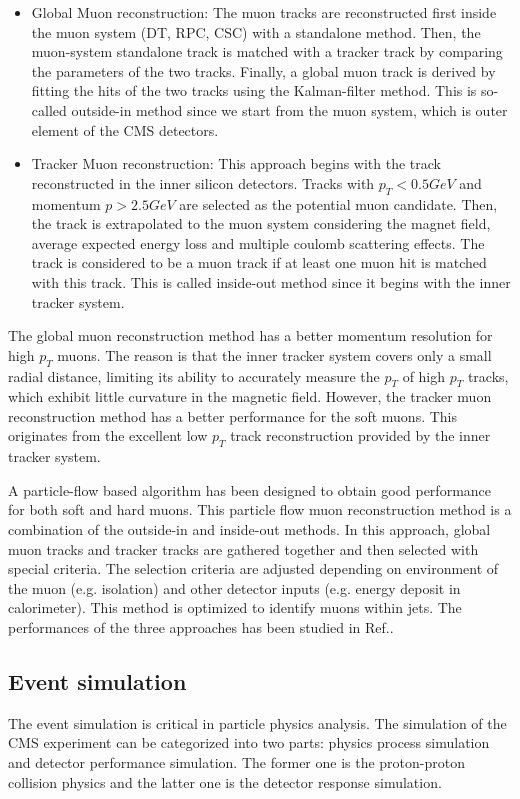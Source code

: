\begin{itemize}
	\item Global Muon reconstruction: The muon tracks are reconstructed first inside the muon system (DT, RPC, CSC) with a standalone method. Then, the muon-system standalone track is matched with a tracker track by comparing the parameters of the two tracks. Finally, a global muon track is derived by fitting the hits of the two tracks using the Kalman-filter method\cite{Fruhwirth:1987fm}. This is so-called outside-in method since we start from the muon system, which is outer element of the CMS detectors. 
  \item Tracker Muon reconstruction: This approach begins with the track reconstructed in the inner silicon detectors. Tracks with $p_{T}<0.5 GeV$ and momentum $p>2.5GeV$ are selected as the potential muon candidate. Then, the track is extrapolated to the muon system considering the magnet field, average expected energy loss and multiple coulomb scattering effects. The track is considered to be a muon track if at least one muon hit is matched with this track. This is called inside-out method since it begins with the inner tracker system. 
\end{itemize}

The global muon reconstruction method has a better momentum resolution for high $p_{T}$ muons. The reason is that the inner tracker system covers only a small radial distance, limiting its ability to accurately measure the $p_{T}$ of high $p_{T}$ tracks, which exhibit little curvature in the magnetic field. However, the tracker muon reconstruction method has a better performance for the soft muons. This originates from the excellent low $p_{T}$ track reconstruction provided by the inner tracker system. 

A particle-flow based algorithm has been designed to obtain good performance for both soft and hard muons. This particle flow muon reconstruction method is a combination of the outside-in and inside-out methods. In this approach, global muon tracks and tracker tracks are gathered together and then selected with special criteria. The selection criteria are adjusted depending on environment of the muon (e.g. isolation) and other detector inputs (e.g. energy deposit in calorimeter). This method is optimized to identify muons within jets. The performances of the three approaches has been studied in Ref.\cite{Chatrchyan:2012xi}. 

\clearpage
\subsection{Event simulation}
The event simulation is critical in particle physics analysis. The simulation of the CMS experiment can be categorized into two parts: physics process simulation and detector performance simulation. The former one is the proton-proton collision physics and the latter one is the detector response simulation. 

